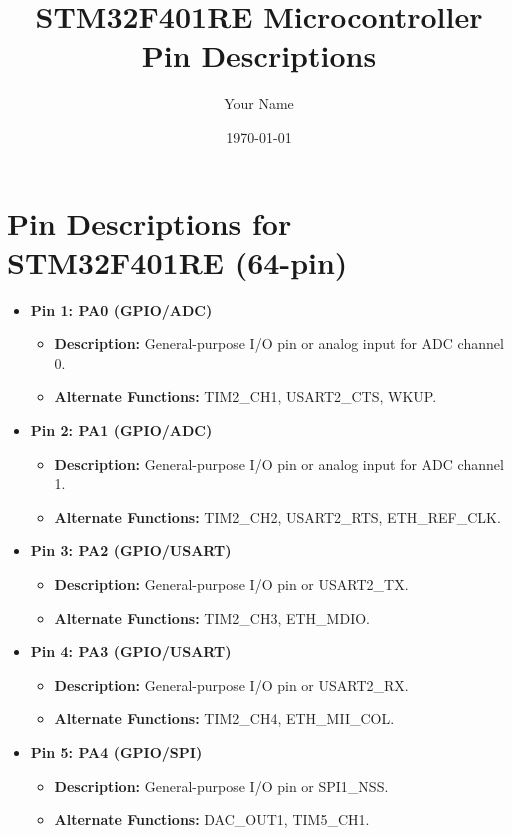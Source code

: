 \documentclass{article}
\begin{document}
\title{STM32F401RE Microcontroller Pin Descriptions}
\author{Your Name}
\date{\today}
\maketitle

\section*{Pin Descriptions for STM32F401RE (64-pin)}

\begin{itemize}
    \item \textbf{Pin 1: PA0 (GPIO/ADC)} 
    \begin{itemize}
        \item \textbf{Description:} General-purpose I/O pin or analog input for ADC channel 0.
        \item \textbf{Alternate Functions:} TIM2\_CH1, USART2\_CTS, WKUP.
    \end{itemize}
    
    \item \textbf{Pin 2: PA1 (GPIO/ADC)} 
    \begin{itemize}
        \item \textbf{Description:} General-purpose I/O pin or analog input for ADC channel 1.
        \item \textbf{Alternate Functions:} TIM2\_CH2, USART2\_RTS, ETH\_REF\_CLK.
    \end{itemize}

    \item \textbf{Pin 3: PA2 (GPIO/USART)} 
    \begin{itemize}
        \item \textbf{Description:} General-purpose I/O pin or USART2\_TX.
        \item \textbf{Alternate Functions:} TIM2\_CH3, ETH\_MDIO.
    \end{itemize}
    
    \item \textbf{Pin 4: PA3 (GPIO/USART)} 
    \begin{itemize}
        \item \textbf{Description:} General-purpose I/O pin or USART2\_RX.
        \item \textbf{Alternate Functions:} TIM2\_CH4, ETH\_MII\_COL.
    \end{itemize}
    
    \item \textbf{Pin 5: PA4 (GPIO/SPI)} 
    \begin{itemize}
        \item \textbf{Description:} General-purpose I/O pin or SPI1\_NSS.
        \item \textbf{Alternate Functions:} DAC\_OUT1, TIM5\_CH1.
    \end{itemize}
    

\end{itemize}
\end{document}
